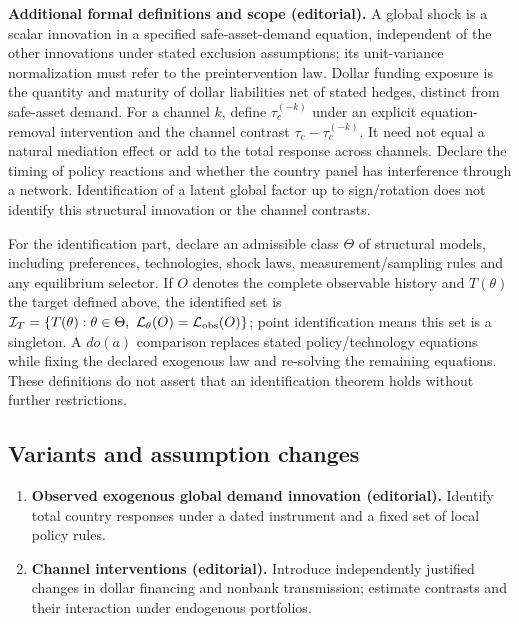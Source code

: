 \documentclass[11pt,a4paper]{article}
\begin{document}
\textbf{Additional formal definitions and scope (editorial).} A global shock is a scalar innovation in a specified safe-asset-demand equation, independent of the other innovations under stated exclusion assumptions; its unit-variance normalization must refer to the preintervention law. Dollar funding exposure is the quantity and maturity of dollar liabilities net of stated hedges, distinct from safe-asset demand. For a channel \(k\), define \(\tau_c^{(-k)}\) under an explicit equation-removal intervention and the channel contrast \(\tau_c-\tau_c^{(-k)}\). It need not equal a natural mediation effect or add to the total response across channels. Declare the timing of policy reactions and whether the country panel has interference through a network. Identification of a latent global factor up to sign/rotation does not identify this structural innovation or the channel contrasts.

For the identification part, declare an admissible class \(\Theta\) of structural models, including preferences, technologies, shock laws, measurement/sampling rules and any equilibrium selector. If \(O\) denotes the complete observable history and \(T(\theta)\) the target defined above, the identified set is \(\mathcal I_T=\{T(\theta):\theta\in\Theta,\ \mathcal L_\theta(O)=\mathcal L_{\rm obs}(O)\}\); point identification means this set is a singleton. A \(do(a)\) comparison replaces stated policy/technology equations while fixing the declared exogenous law and re-solving the remaining equations. These definitions do not assert that an identification theorem holds without further restrictions.
\subsection*{Variants and assumption changes}
\begin{enumerate}
\item \textbf{Observed exogenous global demand innovation (editorial).} Identify total country responses under a dated instrument and a fixed set of local policy rules.
\item \textbf{Channel interventions (editorial).} Introduce independently justified changes in dollar financing and nonbank transmission; estimate contrasts and their interaction under endogenous portfolios.
\end{enumerate}
\end{document}
